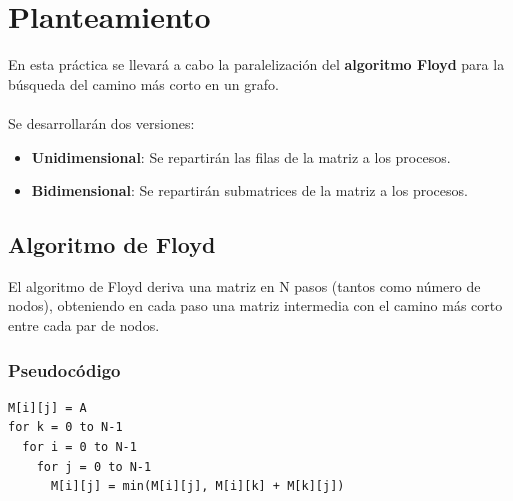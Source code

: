 \setcounter{page}{0}
\setcounter{secnumdepth}{4}

\maketitle %
\thispagestyle{empty}

\newpage %

\tableofcontents

\newpage


\section{Planteamiento}

En esta práctica se llevará a cabo la paralelización del \textbf{algoritmo Floyd} para la búsqueda del camino más corto en un grafo.
\\ \\
Se desarrollarán dos versiones:
\begin{itemize}
	\item \textbf{Unidimensional}: Se repartirán las filas de la matriz a los procesos.
	\item \textbf{Bidimensional}: Se repartirán submatrices de la matriz a los procesos.
\end{itemize}

\subsection{Algoritmo de Floyd}

El algoritmo de Floyd deriva una matriz en N pasos (tantos como número de nodos), obteniendo en cada paso una matriz intermedia con el camino más corto entre cada par de nodos.

\subsubsection{Pseudocódigo}

\begin{lstlisting}[style=c]
M[i][j] = A
for k = 0 to N-1
  for i = 0 to N-1
    for j = 0 to N-1
      M[i][j] = min(M[i][j], M[i][k] + M[k][j])
\end{lstlisting}

